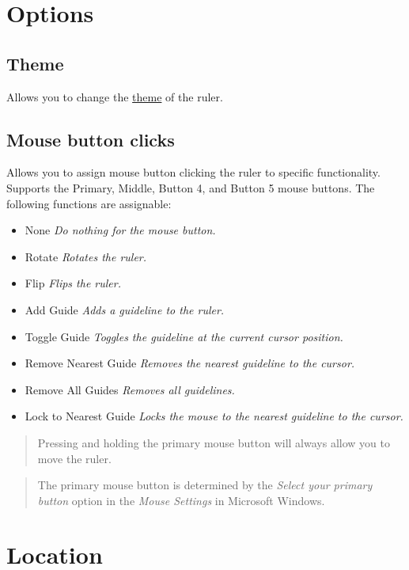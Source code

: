 \documentclass[
]{book}
\providecommand{\tightlist}{%
  \setlength{\itemsep}{0pt}\setlength{\parskip}{0pt}}
\begin{document}
\section{Options}\label{options}

\subsection{Theme}\label{theme}

Allows you to change the \hyperref[themes]{theme} of the ruler.

\subsection{Mouse button clicks}\label{mouse-button-clicks}

Allows you to assign mouse button clicking the ruler to specific functionality.
Supports the Primary, Middle, Button 4, and Button 5 mouse buttons.
The following functions are assignable:

\begin{itemize}
\tightlist
\item
  None \emph{Do nothing for the mouse button.}
\item
  Rotate \emph{Rotates the ruler.}
\item
  Flip \emph{Flips the ruler.}
\item
  Add Guide \emph{Adds a guideline to the ruler.}
\item
  Toggle Guide \emph{Toggles the guideline at the current cursor position.}
\item
  Remove Nearest Guide \emph{Removes the nearest guideline to the cursor.}
\item
  Remove All Guides \emph{Removes all guidelines.}
\item
  Lock to Nearest Guide \emph{Locks the mouse to the nearest guideline to the cursor.}
\end{itemize}

\begin{quote}
Pressing and holding the primary mouse button will always allow you to move the ruler.
\end{quote}

\begin{quote}
The primary mouse button is determined by the \emph{Select your primary button} option in the \emph{Mouse Settings} in Microsoft Windows.
\end{quote}

\section{Location}\label{location}
\end{document}
